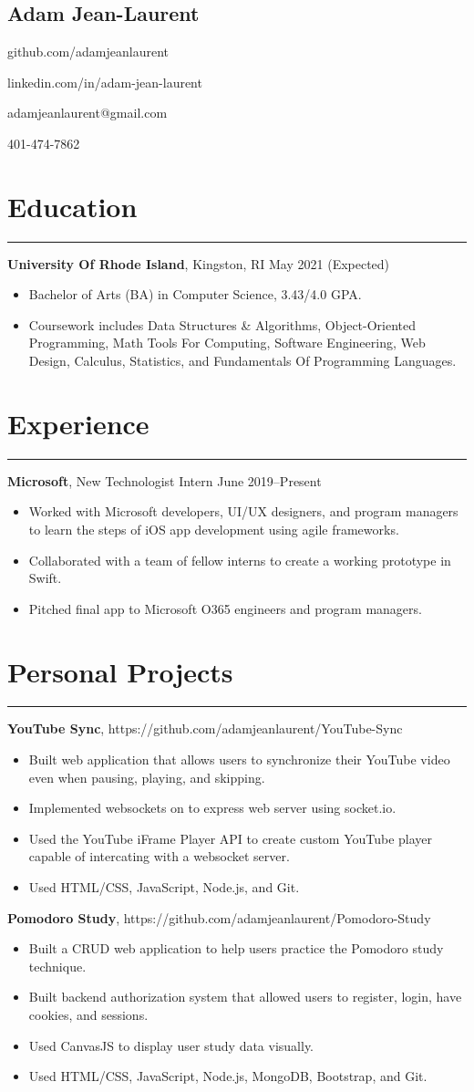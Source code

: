 \documentclass[11pt]{article}
\newcommand{\name}[1]{\begin{center}\section*{\huge #1}\end{center}}
\newcommand{\topinfo}[1]{\begin{center}\vspace{-0.2cm}#1\vspace{-0.2cm}\end{center}}
\newcommand{\resumesection}[1]{\vspace{-0.2cm}\section*{#1}\vspace{-0.2cm}\hrule\vspace{0.2cm}}
\begin{document}
\name{Adam Jean-Laurent}
\topinfo{github.com/adamjeanlaurent}
\topinfo{linkedin.com/in/adam-jean-laurent}
\topinfo{adamjeanlaurent@gmail.com}
\topinfo{401-474-7862}

\resumesection{Education}

\textbf{University Of Rhode Island}, Kingston, RI \hfill May 2021 (Expected)
\begin{itemize}
	\item Bachelor of Arts (BA) in Computer Science, 3.43/4.0 GPA.
	\item Coursework includes Data Structures \& Algorithms, Object-Oriented Programming, Math Tools For Computing, Software Engineering, Web Design, Calculus, Statistics, and Fundamentals Of Programming Languages. 
\end{itemize}

\resumesection{Experience}

\textbf{Microsoft}, New Technologist Intern \hfill June 2019--Present
\begin{itemize}
	\item Worked with Microsoft developers, UI/UX designers, and program managers to learn the steps of iOS app development using agile frameworks.
	\item Collaborated with a team of fellow interns to create a working prototype in Swift.
	\item Pitched final app to Microsoft O365 engineers and program managers.
\end{itemize}

\resumesection{Personal Projects}

\textbf{YouTube Sync}, https://github.com/adamjeanlaurent/YouTube-Sync  
\begin{itemize}
	\item Built web application that allows users to synchronize their YouTube video even when pausing, playing, and skipping.
	\item Implemented websockets on to express web server using socket.io.
	\item Used the YouTube iFrame Player API to create custom YouTube player capable of intercating with a websocket server.
	\item Used HTML/CSS, JavaScript, Node.js, and Git.
\end{itemize}

\textbf{Pomodoro Study}, https://github.com/adamjeanlaurent/Pomodoro-Study
\begin{itemize}
	\item Built a CRUD web application to help users practice the Pomodoro study technique.
	\item  Built backend authorization system that allowed users to register, login, have cookies, and sessions.
	\item Used CanvasJS to display user study data visually.
	\item Used HTML/CSS, JavaScript, Node.js, MongoDB, Bootstrap, and Git.
\end{itemize}
\end{document}
